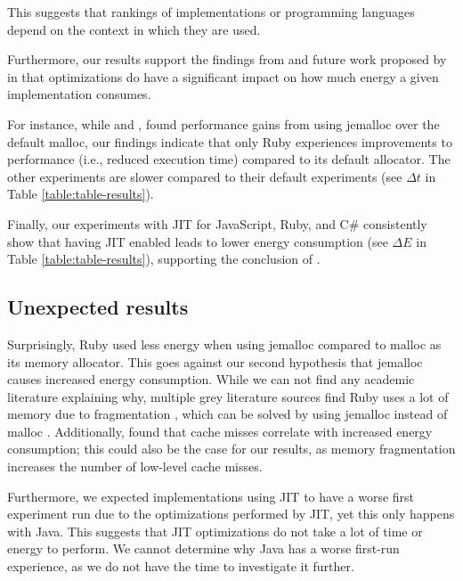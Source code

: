 \documentclass[main.tex]{subfiles}
\begin{document}
This suggests that rankings of implementations or programming languages depend on the context in which they are used.

Furthermore, our results support the findings from \textcite{Kempen_Kwon_Nguyen_Berger_2024} and future work proposed by \textcite{Pfeiffer_Offenberg_Pedersen_Landsgaard_Karlsen, Pfeiffer_Trindade_Meding_Harwick} in that optimizations do have a significant impact on how much energy a given implementation consumes. 

For instance, while \textcite{Li_Wu_Kavi_Mehta_Yadwadkar_John_2023} and \textcite{Lamprakos_Papadopoulos_Catthoor_Soudris_2022}, found performance gains from using jemalloc over the default malloc, our findings indicate that only Ruby experiences improvements to performance (i.e., reduced execution time) compared to its default allocator. The other experiments are slower compared to their default experiments (see $\Delta t$ in Table \ref{table:table-results}).

Finally, our experiments with JIT for JavaScript, Ruby, and C\# consistently show that having JIT enabled leads to lower energy consumption (see $\Delta E$ in Table \ref{table:table-results}), supporting the conclusion of  \textcite{Stoico_Dragomir_Lago_2025, Ournani_Belgaid_Rouvoy_Rust_Penhoat_2021, Hu_John_2006}.

\subsection{Unexpected results}
Surprisingly, Ruby used less energy when using jemalloc compared to malloc as its memory allocator. This goes against our second hypothesis that jemalloc causes increased energy consumption. While we can not find any academic literature explaining why, multiple grey literature sources find Ruby uses a lot of memory due to fragmentation \cite{ruby-developer-memory-fragmentation, ruby-memory-fargmentation-joyfulbikesheddingWhatCauses}, which can be solved by using jemalloc instead of malloc \cite{ruby-jemalloc-fix, ruby-sidekiq-jemalloc}. Additionally, \textcite{Kempen_Kwon_Nguyen_Berger_2024} found that cache misses correlate with increased energy consumption; this could also be the case for our results, as memory fragmentation increases the number of low-level cache misses.

Furthermore, we expected implementations using JIT to have a worse first experiment run due to the optimizations performed by JIT, yet this only happens with Java. This suggests that JIT optimizations do not take a lot of time or energy to perform. We cannot determine why Java has a worse first-run experience, as we do not have the time to investigate it further.
\end{document}
